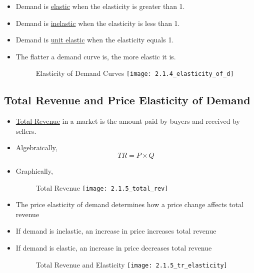 \begin{itemize}

\item Demand is \underline{elastic} when the elasticity is greater than 1.

\item Demand is \underline{inelastic} when the elasticity is less than 1.

\item Demand is \underline{unit elastic} when the elasticity equals 1.

\item The flatter a demand curve is, the more elastic it is.

\begin{figure}[ht]
Elasticity of Demand Curves
\centering
\texttt{[image: 2.1.4\_elasticity\_of\_d]}
\end{figure}

\end{itemize}



\subsection{Total Revenue and Price Elasticity of Demand}

\begin{itemize}

\item \underline{Total Revenue} in a market is the amount paid by buyers and received by sellers.

\item Algebraically, \[TR = P \times Q\]

\newpage

\item Graphically, 

\begin{figure}[ht]
Total Revenue
\centering
\texttt{[image: 2.1.5\_total\_rev]}
\end{figure}

\item The price elasticity of demand determines how a price change affects total revenue


\item If demand is inelastic, an increase in price increases total revenue

\item If demand is elastic, an increase in price decreases total revenue

\begin{figure}[ht]
Total Revenue and Elasticity
\centering
\texttt{[image: 2.1.5\_tr\_elasticity]}
\end{figure}

\end{itemize}

